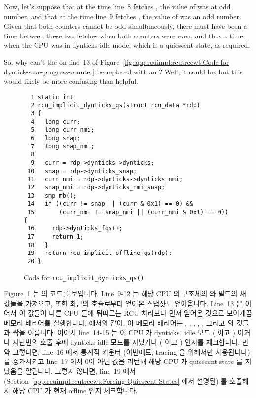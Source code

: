 {	Now, let's suppose that at the time line~8 fetches ,
	the value of  was at odd number, and that at the
	time line~9 fetches , the value of
	 was an odd number.
	Given that both counters cannot be odd simultaneously, there must
	have been a time between these two fetches when both counters
	were even, and thus a time when the CPU was in dynticks-idle
	mode, which is a quiescent state, as required.

	So, why can't the \co{&&} on line~13 of
	Figure~\ref{fig:app:rcuimpl:rcutreewt:Code for dyntick-save-progress-counter}
	be replaced with an \co{==}?
	Well, it could be, but this would likely be more confusing
	than helpful.
	\fi
} \QuickQuizEnd

\begin{figure}[tbp]
{ \scriptsize
\begin{verbatim}
  1 static int
  2 rcu_implicit_dynticks_qs(struct rcu_data *rdp)
  3 {
  4   long curr;
  5   long curr_nmi;
  6   long snap;
  7   long snap_nmi;
  8
  9   curr = rdp->dynticks->dynticks;
 10   snap = rdp->dynticks_snap;
 11   curr_nmi = rdp->dynticks->dynticks_nmi;
 12   snap_nmi = rdp->dynticks_nmi_snap;
 13   smp_mb();
 14   if ((curr != snap || (curr & 0x1) == 0) &&
 15       (curr_nmi != snap_nmi || (curr_nmi & 0x1) == 0)) {
 16     rdp->dynticks_fqs++;
 17     return 1;
 18   }
 19   return rcu_implicit_offline_qs(rdp);
 20 }
\end{verbatim}
}
\caption{Code for {\tt rcu\_\-implicit\_\-dynticks\_\-qs()}}
\label{fig:app:rcuimpl:rcutreewt:Code for rcu-implicit-dynticks-qs}
\end{figure}

Figure~\ref{fig:app:rcuimpl:rcutreewt:Code for rcu-implicit-dynticks-qs}
는  의 코드를 보입니다.
Line~9-12 는 해당 CPU 의  구조체의  와
 필드의 새 값들을 가져오고, 또한 최근의
 호출로부터 얻어온 스냅샷도 얻어옵니다.
Line~13 은 이어서 이 값들이 다른 CPU 들에 뒤따르는 RCU 처리보다 먼저 얻어온
것으로 보이게끔 메모리 배리어를 실행합니다.
 에서와 같이, 이 메모리 배리어는
, , ,
, , 그리고  의 것들과
짝을 이룹니다.
이어서 line~14-15 는 이 CPU 가 dynticks_idle 모드 ( 이고
) 이거나 지난번의 
호출 후에 dynticks-idle 모드를 지났거나 ( 이고 ) 인지를 체크합니다.
만약 그렇다면, line~16 에서  통계적 카운터 (이번에도,
tracing 을 위해서만 사용됩니다) 를 증가시키고 line~17 에서 0이 아닌 값을 리턴해
해당 CPU 가 quiescent state 를 지났음을 알립니다.
그렇지 않다면, line~19 에서
(Section~\ref{app:rcuimpl:rcutreewt:Forcing Quiescent States} 에서 설명된)
 를 호출해서 해당 CPU 가 현재 offline 인지
체크합니다.
\iffalse

